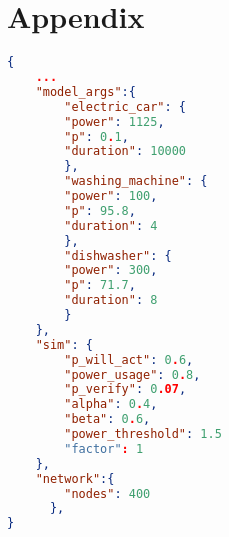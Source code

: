 \chapter{Appendix}

\begin{lstlisting}[language=json,firstnumber=1, 
    caption={Configuration file for scenario 1
    },captionpos=b,label={scenario1config}]
{
    ...
    "model_args":{
        "electric_car": {
        "power": 1125,
        "p": 0.1,
        "duration": 10000
        },
        "washing_machine": {
        "power": 100,
        "p": 95.8,
        "duration": 4
        },
        "dishwasher": {
        "power": 300,
        "p": 71.7,
        "duration": 8
        } 
    },
    "sim": {
        "p_will_act": 0.6,
        "power_usage": 0.8,
        "p_verify": 0.07,
        "alpha": 0.4,
        "beta": 0.6,
        "power_threshold": 1.5
        "factor": 1
    },
    "network":{
        "nodes": 400
      }, 
}
\end{lstlisting}
